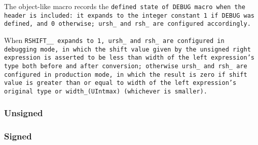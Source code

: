 \def\Subsubsection#1{\subsubsection{#1}
}

The object-like macro  records the \tt{defined} state
of \tt{DEBUG} macro when the header  is included:
it expands to the integer constant \tt{1} if \tt{DEBUG} was defined,
and \tt{0} otherwise; \tt{ursh_} and \tt{rsh_} are configured accordingly.

When \tt{RSHIFT__} expands to \tt{1}, \tt{ursh_}
and \tt{rsh_} are configured in debugging mode, in
which the shift value given by the unsigned right expression is asserted to be
less than width of the left expression's type both before and after conversion;
otherwise \tt{ursh_} and \tt{rsh_} are configured in production mode, in which
the result is zero if shift value is greater than or equal to width of the left
expression's original type or \tt{width_(UIntmax)} (whichever is smaller).

\Subsubsection{Unsigned}

\Subsubsection{Signed}
